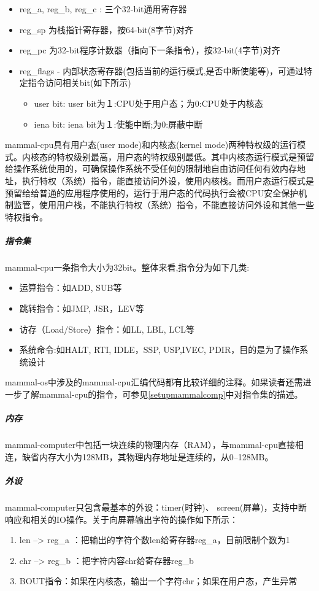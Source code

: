 \begin{itemize}
	\item reg\_a, reg\_b, reg\_c : 三个32-bit通用寄存器
	\item reg\_sp 为栈指针寄存器，按64-bit(8字节)对齐
	\item reg\_pc 为32-bit程序计数器（指向下一条指令），按32-bit(4字节)对齐
	\item reg\_flags - 内部状态寄存器(包括当前的运行模式,是否中断使能等)，可通过特定指令访问相关bit(如下所示)	
	\begin{itemize}
      \item  user bit: user bit为１:CPU处于用户态；为0:CPU处于内核态
      \item  iena bit: iena bit为１:使能中断;为0:屏蔽中断		
	\end{itemize}
\end{itemize}

mammal-cpu具有用户态(user mode)和内核态(kernel mode)两种特权级的运行模式。内核态的特权级别最高，用户态的特权级别最低。其中内核态运行模式是预留给操作系统使用的，可确保操作系统不受任何的限制地自由访问任何有效内存地址，执行特权（系统）指令，能直接访问外设，使用内核栈。而用户态运行模式是预留给给普通的应用程序使用的，运行于用户态的代码执行会被CPU安全保护机制监管，使用用户栈，不能执行特权（系统）指令，不能直接访问外设和其他一些特权指令。

\subparagraph{指令集}
mammal-cpu一条指令大小为32bit。整体来看,指令分为如下几类:
\begin{itemize}
\item 运算指令：如ADD, SUB等
\item 跳转指令：如JMP, JSR，LEV等
\item 访存（Load/Store）指令：如LL, LBL, LCL等
\item 系统命令:如HALT, RTI, IDLE，SSP, USP,IVEC, PDIR，目的是为了操作系统设计
\end{itemize}

mammal-os中涉及的mammal-cpu汇编代码都有比较详细的注释。如果读者还需进一步了解mammal-cpu的指令，可参见\ref{setupmammalcomp}中对指令集的描述。

\subparagraph{内存}
mammal-computer中包括一块连续的物理内存（RAM），与mammal-cpu直接相连，缺省内存大小为128MB，其物理内存地址是连续的，从0--128MB。

\subparagraph{外设}\label{mammaldevice}

mammal-computer只包含最基本的外设：timer(时钟)、 screen(屏幕)，支持中断响应和相关的IO操作。关于向屏幕输出字符的操作如下所示：
\begin{enumerate}
\item len --> reg\_a ：把输出的字符个数len给寄存器reg\_a，目前限制个数为1
\item chr --> reg\_b   ：把字符内容chr给寄存器reg\_b
\item BOUT指令：如果在内核态，输出一个字符chr；如果在用户态，产生异常
\end{enumerate}

